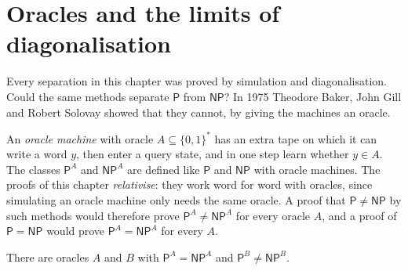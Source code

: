 \section{Oracles and the limits of diagonalisation}\label{sec:oracles}

Every separation in this chapter was proved by simulation and diagonalisation. Could the same methods separate $\mathsf P$ from $\mathsf{NP}$? In 1975 Theodore Baker, John Gill and Robert Solovay showed that they cannot, by giving the machines an oracle.

An \emph{oracle machine} with oracle $A\subseteq\{0,1\}^*$ has an extra tape on which it can write a word $y$, then enter a query state, and in one step learn whether $y\in A$. The classes $\mathsf P^A$ and $\mathsf{NP}^A$ are defined like $\mathsf P$ and $\mathsf{NP}$ with oracle machines. The proofs of this chapter \emph{relativise}: they work word for word with oracles, since simulating an oracle machine only needs the same oracle. A proof that $\mathsf P\ne\mathsf{NP}$ by such methods would therefore prove $\mathsf P^A\ne\mathsf{NP}^A$ for every oracle $A$, and a proof of $\mathsf P=\mathsf{NP}$ would prove $\mathsf P^A=\mathsf{NP}^A$ for every $A$.

\begin{theorem}\label{thm:bgs}
There are oracles $A$ and $B$ with $\mathsf P^A=\mathsf{NP}^A$ and $\mathsf P^B\ne\mathsf{NP}^B$.
\end{theorem}


